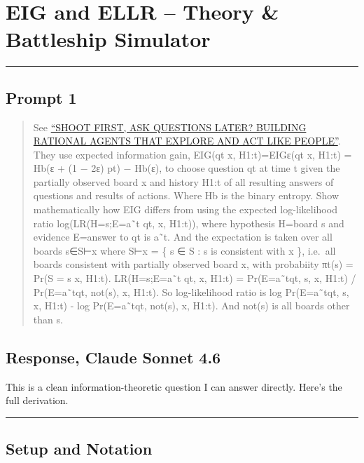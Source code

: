 \documentclass[
]{article}
\author{}
\date{\vspace{-2.5em}}
\begin{document}
\section{EIG and ELLR -- Theory \& Battleship
Simulator}\label{eig-and-ellr-theory-battleship-simulator}

\begin{center}\rule{0.5\linewidth}{0.5pt}\end{center}

\subsection{Prompt 1}\label{prompt-1}

\begin{quote}
See \href{https://arxiv.org/pdf/2510.20886}{``SHOOT FIRST, ASK QUESTIONS
LATER? BUILDING RATIONAL AGENTS THAT EXPLORE AND ACT LIKE PEOPLE''}.
They use expected information gain, EIG(qt \textbar{} x, H1:t)=EIGε(qt
\textbar{} x, H1:t) = Hb(ε + (1 − 2ε) pt) − Hb(ε), to choose question qt
at time t given the partially observed board x and history H1:t of all
resulting answers of questions and results of actions. Where Hb is the
binary entropy. Show mathematically how EIG differs from using the
expected log-likelihood ratio log(LR(H=s;E=a˜t \textbar qt, x, H1:t)),
where hypothesis H=board s and evidence E=answer to qt is a˜t. And the
expectation is taken over all boards s∈S⊢x where S⊢x = \{ s ∈ S : s is
consistent with x \}, i.e.~all boards consistent with partially observed
board x, with probabiity πt(s) = Pr(S = s \textbar{} x, H1:t).
LR(H=s;E=a˜t \textbar qt, x, H1:t) = Pr(E=a˜t\textbar qt, s, x, H1:t) /
Pr(E=a˜t\textbar qt, not(s), x, H1:t). So log-likelihood ratio is log
Pr(E=a˜t\textbar qt, s, x, H1:t) - log Pr(E=a˜t\textbar qt, not(s), x,
H1:t). And not(s) is all boards other than s.
\end{quote}

\subsection{Response, Claude Sonnet
4.6}\label{response-claude-sonnet-4.6}

This is a clean information-theoretic question I can answer directly.
Here's the full derivation.

\begin{center}\rule{0.5\linewidth}{0.5pt}\end{center}

\subsection{Setup and Notation}\label{setup-and-notation}
\end{document}
